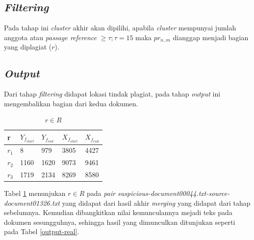 \documentclass[../Book.tex]{subfiles}
\begin{document}
	\subsection{\textit{Filtering}}
	
	Pada tahap ini \textit{cluster} akhir akan dipilihi, apabila \textit{cluster} mempunyai jumlah anggota atau \textit{passage reference} $\geq \tau; \tau = 15$\cite{mcs} maka $pr_{n..m}$ dianggap menjadi bagian yang diplagiat ($r$).
	
	\subsection{\textit{Output}}
	
	Dari tahap \textit{filtering} didapat lokasi tindak plagiat, pada tahap \textit{output} ini mengembalikan bagian dari kedua dokumen. \\
	
	\begin{table}[H]
		\centering
		\caption{$r \in R$}
		\label{output}
		\begin{tabular}{@{}lllll@{}}
			\toprule
			r & $Y_{f_{start}}$ & $Y_{f_{end}}$ & $X_{f_{start}}$ & $X_{f_{end}}$ \\ \midrule
			$r_{1}$ & 8       & 979   & 3805    & 4427  \\
			$r_{2}$ & 1160    & 1620  & 9073    & 9461  \\
			$r_{3}$ & 1719    & 2134  & 8269    & 8580  \\ \bottomrule
		\end{tabular}
	\end{table}
	
	\noindent Tabel \ref{output} menunjukan $r \in R$ pada \textit{pair suspicious-document00044.txt-source-document01326.txt} yang didapat dari hasil akhir \textit{merging} yang didapat dari tahap sebelumnya. Kemudian dibangkitkan nilai kemunculannya mejadi teks pada dokumen sesungguhnya, sehingga hasil yang dimunculkan ditunjukan seperti pada Tabel \ref{output-real}.
	
		\newpage
	
\end{document}

